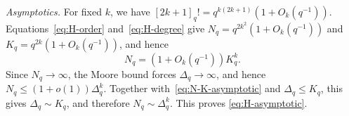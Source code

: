 \documentclass[10pt,a4paper]{amsart}
\makeatletter
\renewenvironment{proof}[1][\proofname]
{\par\pushQED{\qed}
	\normalfont\topsep6\p@\@plus6\p@\relax\trivlist
	\item[\hskip\labelsep\bfseries#1\@addpunct{.}]
	\ignorespaces}
\makeatother
\begin{document}
\begin{proof}
\smallskip
\noindent\emph{Asymptotics.}
For fixed $k$, we have
$[2k+1]_q!
=q^{k(2k+1)}\left(1+O_k(q^{-1})\right).$
Equations~\eqref{eq:H-order} and~\eqref{eq:H-degree} give $N_q=q^{2k^2}\left(1+O_k(q^{-1})\right)$ and $K_q=q^{2k}\left(1+O_k(q^{-1})\right)$, 
and hence
\begin{equation}\label{eq:N-K-asymptotic}
  N_q=\left(1+O_k(q^{-1})\right)K_q^k.
\end{equation}
Since $N_q\to\infty$, the Moore bound forces $\Delta_q\to\infty$, and hence $N_q\le(1+o(1))\Delta_q^k$.
Together with~\eqref{eq:N-K-asymptotic} and $\Delta_q\le K_q$, this gives $\Delta_q\sim K_q$, and therefore $N_q\sim\Delta_q^k$.  This proves \eqref{eq:H-asymptotic}.
\end{proof}
\end{document}
